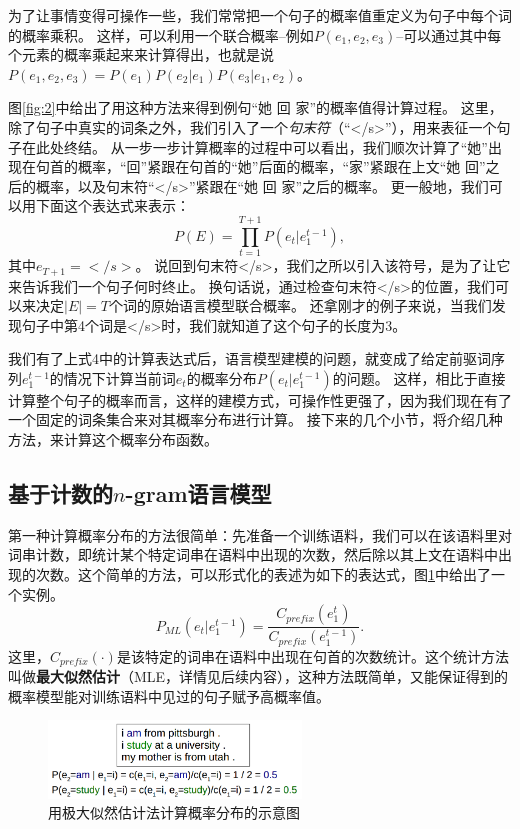 \documentclass[10pt,a4paper]{ctexart}
\begin{document}
为了让事情变得可操作一些，我们常常把一个句子的概率值重定义为句子中每个词的概率乘积。
这样，可以利用一个联合概率--例如$P(e_1,e_2,e_3)$--可以通过其中每个元素的概率乘起来来计算得出，也就是说$P(e_1,e_2,e_3)=P(e_1)P(e_2|e_1)P(e_3|e_1,e_2)$。

图\ref{fig:2}中给出了用这种方法来得到例句“她 回 家”的概率值得计算过程。
这里，除了句子中真实的词条之外，我们引入了一个\textit{句末符}（“</s>”），用来表征一个句子在此处终结。
从一步一步计算概率的过程中可以看出，我们顺次计算了“她”出现在句首的概率，“回”紧跟在句首的“她”后面的概率，“家”紧跟在上文“她 回”之后的概率，以及句末符“</s>”紧跟在“她 回 家”之后的概率。
更一般地，我们可以用下面这个表达式来表示：
\[
 P(E) = \prod_{t=1}^{T+1} P(e_t|e_1^{t-1}),
\]
其中$e_{T+1}=</s>$。
说回到句末符</s>，我们之所以引入该符号，是为了让它来告诉我们一个句子何时终止。
换句话说，通过检查句末符</s>的位置，我们可以来决定$|E|=T$个词的原始语言模型联合概率。
还拿刚才的例子来说，当我们发现句子中第4个词是</s>时，我们就知道了这个句子的长度为3。

我们有了上式4中的计算表达式后，语言模型建模的问题，就变成了给定前驱词序列$e_1^{t-1}$的情况下计算当前词$e_t$的概率分布$P(e_t|e_1^{t-1})$的问题。
这样，相比于直接计算整个句子的概率而言，这样的建模方式，可操作性更强了，因为我们现在有了一个固定的词条集合来对其概率分布进行计算。
接下来的几个小节，将介绍几种方法，来计算这个概率分布函数。


\subsection{基于计数的$n$-gram语言模型}
第一种计算概率分布的方法很简单：先准备一个训练语料，我们可以在该语料里对词串计数，即统计某个特定词串在语料中出现的次数，然后除以其上文在语料中出现的次数。这个简单的方法，可以形式化的表述为如下的表达式，图\ref{fig:3}中给出了一个实例。
\[
  P_{ML}(e_t|e_1^{t-1})=\frac{C_{prefix}(e_1^t)}{C_{prefix}(e_1^{t-1})}.
\]
这里，$C_{prefix}(\cdot)$是该特定的词串在语料中出现在句首的次数统计。这个统计方法叫做\textbf{最大似然估计}（MLE，详情见后续内容），这种方法既简单，又能保证得到的概率模型能对训练语料中见过的句子赋予高概率值。

\begin{figure}[H]
\centering
\includegraphics[width=0.6\textwidth]{fig3.png}
\caption{用极大似然估计法计算概率分布的示意图}
\label{fig:3}
\end{figure}
\end{document}
